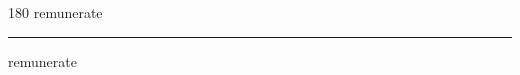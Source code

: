 
\begin{frame}
\begin{center}
\begin{turn}{180}
{\fontsize{2.5cm}{1em}\selectfont remunerate}
\end{turn}
\vspace{1em}\par  
\hrule
\vspace{1em}\par  
{\fontsize{2.5cm}{1em}\selectfont remunerate}
\end{center}
\end{frame}
